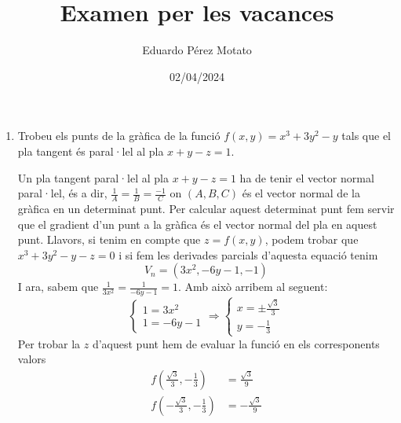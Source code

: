 \documentclass[a4paper, 12pt]{article}
\title{Examen per les vacances}
\author{Eduardo Pérez Motato}
\date{02/04/2024}
\begin{document}
    \makeheader

    \begin{exercici}
        \begin{enumerate}[label=\alph*)]
            \item Trobeu els punts de la gràfica de la funció $f\left(x,y\right) = x^3 + 3y^2 - y$
            tals que el pla tangent és paral·lel al pla $x+y-z=1$.\\
            \begin{solucio}
                Un pla tangent paral·lel al pla $x+y-z=1$ ha de tenir el vector normal paral·lel, és
                a dir, $\frac{1}{A}=\frac{1}{B}=\frac{-1}{C}$ on $\left(A, B, C\right)$ és el vector
                normal de la gràfica en un determinat punt. Per calcular aquest determinat punt fem
                servir que el gradient d'un punt a la gràfica és el vector normal del pla en aquest
                punt. Llavors, si tenim en compte que $z = f(x,y)$, podem trobar que $x^3 + 3y^2 - y - z = 0$
                i si fem les derivades parcials d'aquesta equació tenim 
                \begin{displaymath}
                    V_n = \left(3x^2, -6y-1, -1\right)
                \end{displaymath}
                I ara, sabem que $\frac{1}{3x^2}=\frac{1}{-6y-1} = 1$. Amb això arribem al seguent:
                \begin{displaymath}
                    \begin{cases}
                        1 = 3x^2\\
                        1= -6y-1
                    \end{cases}
                    \Longrightarrow
                    \begin{cases}
                        x = \pm \frac{\sqrt{3}}{3}\\
                        y = -\frac{1}{3}
                    \end{cases}
                \end{displaymath}
                Per trobar la $z$ d'aquest punt hem de evaluar la funció en els corresponents
                valors
                \begin{displaymath}
                    \begin{split}
                        f\left(\frac{\sqrt{3}}{3}, -\frac{1}{3}\right) &= \frac{\sqrt{3}}{9}\\
                        f\left(-\frac{\sqrt{3}}{3}, -\frac{1}{3}\right) &= -\frac{\sqrt{3}}{9}

\end{split}
\end{displaymath}
\end{solucio}
\end{enumerate}
\end{exercici}
\end{document}
